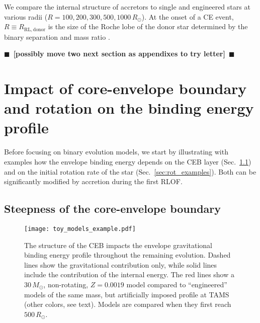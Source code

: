\documentclass[twocolumn,twocolappendix,trackchanges]{aastex63}
\DeclareRobustCommand{\Secref}[1]{Sec.~\ref{#1}}
\newcommand{\todo}[1]{{\large $\blacksquare$~\textbf{\color{red}[#1]}}~$\blacksquare$}
\begin{document}
We compare the internal structure of accretors to single and
engineered stars at various radii
($R=100, 200, 300, 500, 1000\,R_\odot$). At the onset of a CE event,
$R\equiv R_\mathrm{RL, donor}$ is the size of the Roche lobe of the
donor star determined by the binary separation and mass ratio
\citep[e.g.,][]{paczynski:1971, eggleton:83}.%

\todo{possibly move two next section as appendixes to try letter}
\section{Impact of core-envelope boundary and rotation on the binding  energy profile}
\label{sec:intro_res}

Before focusing on binary evolution models, we start by illustrating
with examples how the envelope binding energy depends on the CEB layer
(\Secref{sec:eng_examples}) and on the initial rotation rate of the
star (\Secref{sec:rot_examples}). Both can be significantly modified
by accretion during the first RLOF.

\subsection{Steepness of the core-envelope boundary}
\label{sec:eng_examples}


\begin{figure}[bp]
  \centering
  \texttt{[image: toy\_models\_example.pdf]}
  \caption{The structure of the CEB impacts the envelope gravitational
    binding energy profile throughout the remaining evolution. Dashed
    lines show the gravitational contribution only, while solid lines
    include the contribution of the internal energy. The red lines
    show a $30\,M_\odot$, non-rotating, $Z=0.0019$ model compared to
    ``engineered'' models of the same mass, but artificially imposed
    profile at TAMS (other colors, see text). Models are compared when
    they first reach $500\,R_\odot$.}
  \label{fig:toy_models_example}
\end{figure}
\end{document}
